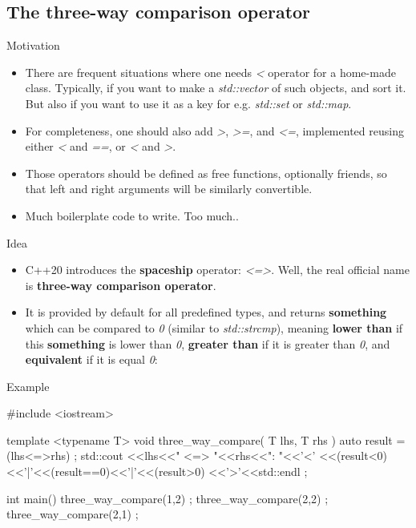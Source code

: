 \subsection[spaceship]{The three-way comparison operator}

\begin{frame}[fragile]
  \begin{block}{Motivation}
    \begin{itemize}
    \item There are frequent situations where one needs {\it <} operator for a home-made class. Typically, if you want to make a {\it std::vector} of such objects, and sort it. But also if you want to use it as a key for e.g. {\it std::set} or {\it std::map}.
    \item For completeness, one should also add {\it >}, {\it >=}, and {\it <=}, implemented reusing either {\it <} and {\it ==}, or {\it <} and {\it >}.
    \item Those operators should be defined as free functions, optionally friends, so that left and right arguments will be similarly convertible.
    \item Much boilerplate code to write. Too much..
    \end{itemize}
  \end{block}
\end{frame}

\begin{frame}[fragile]
  \begin{block}{Idea}
    \begin{itemize}
    \item C++20 introduces the \textbf{spaceship} operator: {\it <=>}. Well, the real official name is \textbf{three-way comparison operator}.
    \item It is provided by default for all predefined types, and returns \textbf{something} which can be compared to {\it 0} (similar to {\it std::strcmp}), meaning \textbf{lower than} if this \textbf{something} is lower than {\it 0}, \textbf{greater than} if it is greater than {\it 0}, and \textbf{equivalent} if it is equal {\it 0}:
    \end{itemize}
  \end{block}
  \begin{exampleblock}{Example}
    \begin{cppcode*}{}
#include <iostream>

template <typename T>
void three_way_compare( T lhs, T rhs )
 {
  auto result = (lhs<=>rhs) ;
  std::cout
    <<lhs<<" <=> "<<rhs<<": "<<'<'
    <<(result<0)<<'|'<<(result==0)<<'|'<<(result>0)
    <<'>'<<std::endl ;
 }

int main()
 {
  three_way_compare(1,2) ;
  three_way_compare(2,2) ;
  three_way_compare(2,1) ;
 }
    \end{cppcode*}
  \end{exampleblock}
\end{frame}

